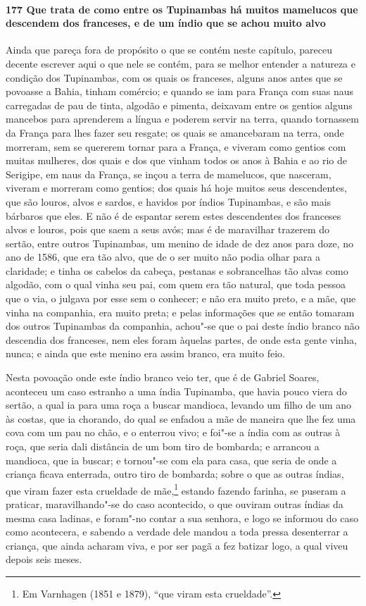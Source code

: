 \begin{linenumbers}
\paragraph{177 Que trata de como entre os Tupinambas há muitos mamelucos que descendem dos
franceses, e de um índio que se achou muito alvo}\quad
Ainda que pareça fora de propósito o que se contém neste capítulo, pareceu decente
escrever aqui o que nele se contém, para se melhor entender a natureza e condição dos
Tupinambas, com os quais os franceses, alguns anos antes que se povoasse a Bahia, tinham
comércio; e quando se iam para França com suas naus carregadas de pau de tinta, algodão e
pimenta, deixavam entre os gentios alguns mancebos para aprenderem a língua e poderem
servir na terra, quando tornassem da França para lhes fazer seu resgate; os quais se
amancebaram na terra, onde morreram, sem se quererem tornar para a França, e viveram como
gentios com muitas mulheres, dos quais e dos que vinham todos os anos à Bahia e ao rio de
Serigipe, em naus da França, se inçou a terra de mamelucos, que nasceram, viveram e
morreram como gentios; dos quais há hoje muitos seus descendentes, que são louros, alvos e
sardos, e havidos por índios Tupinambas, e são mais bárbaros que eles. E não é de espantar
serem estes descendentes dos franceses alvos e louros, pois que saem a seus avós; mas é de
maravilhar trazerem do sertão, entre outros Tupinambas, um menino de idade de dez anos
para doze, no ano de 1586, que era tão alvo, que de o ser muito não podia olhar para a
claridade; e tinha os cabelos da cabeça, pestanas e sobrancelhas tão alvas como algodão,
com o qual vinha seu pai, com quem era tão natural, que toda pessoa que o via, o julgava
por esse sem o conhecer; e não era muito preto, e a mãe, que vinha na companhia, era muito
preta; e pelas informações que se então tomaram dos outros Tupinambas da companhia,
achou"-se que o pai deste índio branco não descendia dos franceses, nem eles foram àquelas
partes, de onde esta gente vinha, nunca; e ainda que este menino era assim branco, era
muito feio.

Nesta povoação onde este índio branco veio ter, que é de Gabriel Soares, aconteceu um caso
estranho a uma índia Tupinamba, que havia pouco viera do sertão, a qual ia para uma roça a
buscar mandioca, levando um filho de um ano às costas, que ia chorando, do qual se enfadou
a mãe de maneira que lhe fez uma cova com um pau no chão, e o enterrou vivo; e foi"-se a
índia com as outras à roça, que seria dali distância de um bom tiro de bombarda; e
arrancou a mandioca, que ia buscar; e tornou"-se com ela para casa, que seria de onde a
criança ficava enterrada, outro tiro de bombarda; sobre o que as outras índias, que viram
fazer esta crueldade de mãe,\footnote{ Em Varnhagen (1851 e 1879), ``que viram esta
crueldade''.} estando fazendo farinha, se puseram a praticar, maravilhando"-se do caso
acontecido, o que ouviram outras índias da mesma casa ladinas, e foram"-no contar a sua
senhora, e logo se informou do caso como acontecera, e sabendo a verdade dele mandou a
toda pressa desenterrar a criança, que ainda acharam viva, e por ser pagã a fez batizar
logo, a qual viveu depois seis meses.


\end{linenumbers}
